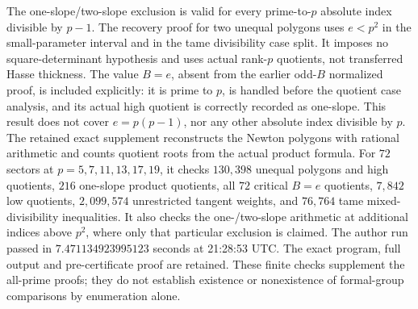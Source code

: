 \begin{remark}
\label{rem:B-RD69-scope}
The one-slope/two-slope exclusion is valid for every
prime-to-\(p\) absolute index divisible by \(p-1\).
The recovery proof for two unequal polygons uses \(e<p^2\)
in the small-parameter interval and in the tame divisibility
case split. It imposes no square-determinant hypothesis and
uses actual rank-\(p\) quotients, not transferred Hasse thickness.
The value \(B=e\), absent from the earlier odd-\(B\) normalized
proof, is included explicitly: it is prime to \(p\), is handled
before the quotient case analysis, and its actual high quotient
is correctly recorded as one-slope.
This result does not cover \(e=p(p-1)\), nor any other absolute
index divisible by \(p\).
The retained exact supplement
reconstructs the Newton polygons with rational arithmetic and
counts quotient roots from the actual product formula.
For \(72\) sectors at \(p=5,7,11,13,17,19\), it checks
\(130{,}398\) unequal polygons and high quotients,
\(216\) one-slope product quotients, all \(72\) critical
\(B=e\) quotients, \(7{,}842\) low quotients,
\(2{,}099{,}574\) unrestricted tangent weights, and
\(76{,}764\) tame mixed-divisibility inequalities.
It also checks the one-/two-slope arithmetic at additional
indices above \(p^2\), where only that particular exclusion is
claimed. The author run passed in \(7.471134923995123\) seconds
at 21:28:53 UTC. The exact program, full output and pre-certificate
proof are retained. These finite checks supplement the all-prime
proofs; they do not establish existence or nonexistence of
formal-group comparisons by enumeration alone.
\end{remark}
